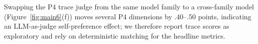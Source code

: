 Swapping the P4 trace judge from the same model family to a cross-family model (Figure~\ref{fig:main6}(f)) moves several P4 dimensions by .40--.50 points, indicating an LLM-as-judge self-preference effect; we therefore report trace scores as exploratory and rely on deterministic matching for the headline metrics.
